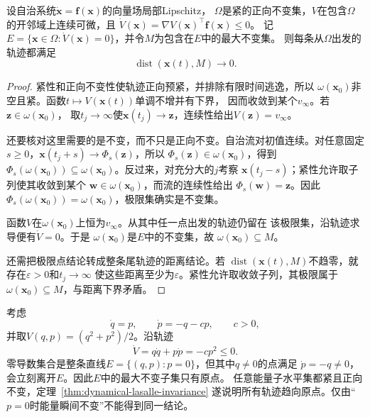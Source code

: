 \begin{theorem}[LaSalle不变性原理]
	\label{thm:dynamical-lasalle-invariance}
	设自治系统$\dot{\bm{x}}=\bm{f}(\bm{x})$的向量场局部Lipschitz，
	$\Omega$是紧的正向不变集，$V$在包含$\Omega$的开邻域上连续可微，且
	$\dot V(\bm{x})=\nabla V(\bm{x})^{\top}\bm{f}(\bm{x})\leq0$。
	记$E=\{\bm{x}\in\Omega:\dot V(\bm{x})=0\}$，并令$M$为包含在$E$中的最大不变集。
	则每条从$\Omega$出发的轨迹都满足
	\[
		\operatorname{dist}(\bm{x}(t),M)\longrightarrow0.
	\]
\end{theorem}

\begin{proof}
	紧性和正向不变性使轨迹正向预紧，并排除有限时间逃逸，所以
	$\omega(\bm{x}_0)$非空且紧。函数$t\mapsto V(\bm{x}(t))$单调不增并有下界，
	因而收敛到某个$v_{\infty}$。若$\bm{z}\in\omega(\bm{x}_0)$，
	取$t_j\to\infty$使$\bm{x}(t_j)\to\bm{z}$，连续性给出$V(\bm{z})=v_{\infty}$。

	还要核对这里需要的是不变，而不只是正向不变。自治流对初值连续。对任意固定
	$s\geq0$，$\bm{x}(t_j+s)\to\Phi_s(\bm{z})$，所以
	$\Phi_s(\bm{z})\in\omega(\bm{x}_0)$，得到
	$\Phi_s(\omega(\bm{x}_0))\subseteq\omega(\bm{x}_0)$。反过来，对充分大的$j$考察
	$\bm{x}(t_j-s)$；紧性允许取子列使其收敛到某个
	$\bm{w}\in\omega(\bm{x}_0)$，而流的连续性给出
	$\Phi_s(\bm{w})=\bm{z}$。因此
	$\Phi_s(\omega(\bm{x}_0))=\omega(\bm{x}_0)$，极限集确实是不变集。

	函数$V$在$\omega(\bm{x}_0)$上恒为$v_{\infty}$。从其中任一点出发的轨迹仍留在
	该极限集，沿轨迹求导便有$\dot V=0$。于是
	$\omega(\bm{x}_0)$是$E$中的不变集，故
	$\omega(\bm{x}_0)\subseteq M$。

	还需把极限点结论转成整条尾轨迹的距离结论。若
	$\operatorname{dist}(\bm{x}(t),M)$不趋零，就存在$\varepsilon>0$和$t_j\to\infty$
	使这些距离至少为$\varepsilon$。紧性允许取收敛子列，其极限属于
	$\omega(\bm{x}_0)\subseteq M$，与距离下界矛盾。
\end{proof}

\begin{example}[阻尼振子的零导数集合]
	\label{ex:dynamical-damped-oscillator-lasalle}
	考虑
	\[
		\dot q=p,\qquad \dot p=-q-cp,\qquad c>0,
	\]
	并取$V(q,p)=(q^2+p^2)/2$。沿轨迹
	\[
		\dot V=q\dot q+p\dot p=-cp^2\leq0.
	\]
	零导数集合是整条直线$E=\{(q,p):p=0\}$，但其中$q\neq0$的点满足
	$\dot p=-q\neq0$，会立刻离开$E$。因此$E$中的最大不变子集只有原点。
	任意能量子水平集都紧且正向不变，定理~\ref{thm:dynamical-lasalle-invariance}
	遂说明所有轨迹趋向原点。仅由“$p=0$时能量瞬间不变”不能得到同一结论。
\end{example}

